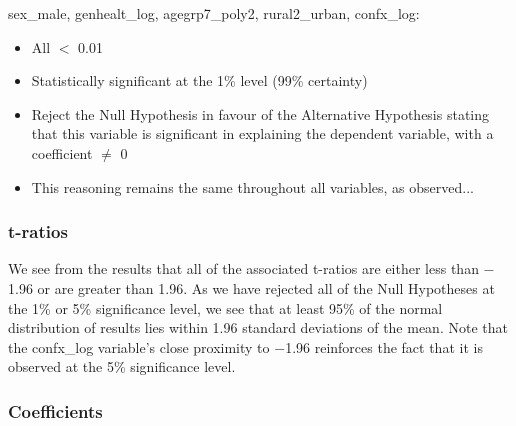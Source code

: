 \documentclass[11pt, english]{article}
\begin{document}
	sex\_male, genhealt\_log, agegrp7\_poly2, rural2\_urban, confx\_log:

	\begin{itemize}
	\setlength\itemsep{0cm}
		\item All $<$ 0.01
		\item Statistically significant at the 1\% level (99\% certainty)
		\item Reject the Null Hypothesis in favour of the Alternative Hypothesis stating that this variable is significant in explaining the dependent variable, with a coefficient $\neq$ 0
		\item This reasoning remains the same throughout all variables, as observed...
	\end{itemize}

		\subsubsection{t-ratios}

	We see from the results that all of the associated t-ratios are either less than $-$1.96 or are greater than 1.96. As we have rejected all of the Null Hypotheses at the 1\% or 5\% significance level, we see that at least 95\% of the normal distribution of results lies within 1.96 standard deviations of the mean. Note that the confx\_log variable's close proximity to $-$1.96 reinforces the fact that it is observed at the 5\% significance level.

		\subsubsection{Coefficients}
\end{document}
